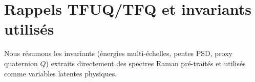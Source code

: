 
\section{Rappels TFUQ/TFQ et invariants utilisés}
Nous résumons les invariants (énergies multi-échelles, pentes PSD, proxy quaternion $Q$) extraits directement des spectres Raman pré-traités et utilisés comme variables latentes physiques.
